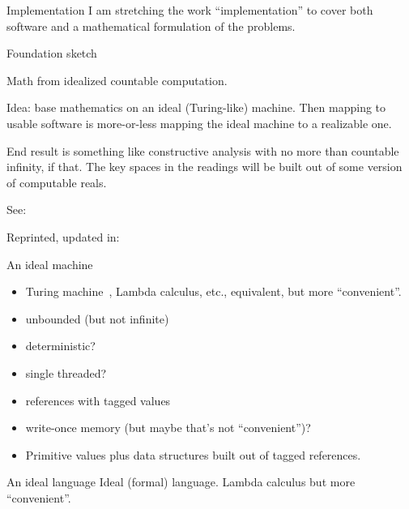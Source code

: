 \documentclass[12pt]{PalisadesLakesBook}
\begin{document}
\begin{plSection}{Implementation}
I am stretching the work ``implementation'' to cover both
software and a mathematical formulation of the problems.
\begin{plSection}{Foundation sketch}

Math from idealized countable computation.

Idea: base mathematics on an ideal (Turing-like) machine.
Then mapping to usable software is more-or-less mapping
the ideal machine to a realizable one.

End result is something like constructive analysis
with no more than countable infinity, if that.
The key spaces in the readings will be built out of 
some version of computable reals.

See:



Reprinted, updated in:




\begin{plSection}{An ideal machine}
\begin{itemize}
  \item Turing machine~\cite{
  Turing:1936:Computability,
  Turing:1937:ComputabilityLambda,
  Turing:1938:ComputabilityCorrection},
  Lambda calculus, etc.,
  equivalent,
  but more ``convenient''.
  \item unbounded (but not infinite)
  \item deterministic?
  \item single threaded?
  \item references with tagged values
  \item write-once memory (but maybe that's not ``convenient'')?
  \item Primitive values plus data structures built out of tagged
  references.
\end{itemize}
\end{plSection}%
\begin{plSection}{An ideal language}
Ideal (formal) language. Lambda calculus but more ``convenient''.


\end{plSection}
\end{plSection}
\end{plSection}
\end{document}
